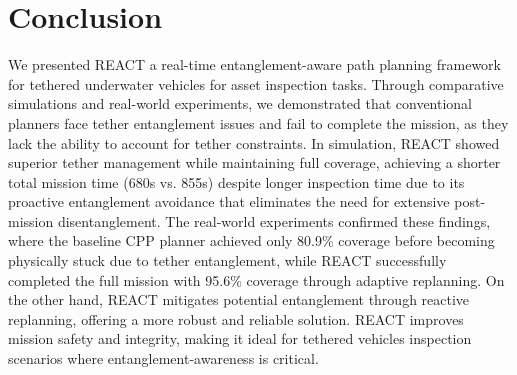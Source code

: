 
\section{Conclusion}
\label{sec:conclusion}


We presented \ac{REACT} a real-time entanglement-aware path planning framework for tethered underwater vehicles for asset inspection tasks. Through comparative simulations and real-world experiments, we demonstrated that conventional planners face tether entanglement issues and fail to complete the mission, as they lack the ability to account for tether constraints. In simulation, \ac{REACT} showed superior tether management while maintaining full coverage, achieving a shorter total mission time (680s vs. 855s) despite longer inspection time due to its proactive entanglement avoidance that eliminates the need for extensive post-mission disentanglement. The real-world experiments confirmed these findings, where the baseline \ac{CPP} planner achieved only 80.9\% coverage before becoming physically stuck due to tether entanglement, while \ac{REACT} successfully completed the full mission with 95.6\% coverage through adaptive replanning. On the other hand, \ac{REACT} mitigates potential entanglement through reactive replanning, offering a more robust and reliable solution. \ac{REACT} improves mission safety and integrity, making it ideal for tethered vehicles inspection scenarios where entanglement-awareness is critical.








